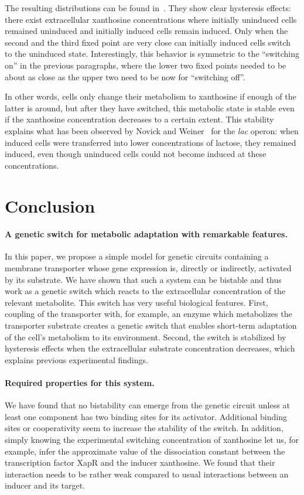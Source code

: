 \documentclass[10pt,letterpaper]{article}
\begin{document}
	The resulting distributions can be found in~. They show
	clear hysteresis effects: there exist extracellular xanthosine concentrations where
	initially uninduced cells remained uninduced and initially induced cells remain induced.
	Only when the second and the third fixed point are very close can initially
	induced cells switch to the uninduced state. Interestingly, this
	behavior is symmetric to the ``switching on'' in the previous paragraphs,
	where the lower two fixed points needed to be about as close as the upper
	two need to be now for ``switching off''.
	
	In other words, cells only change their metabolism to xanthosine if
	enough of the latter is around, but after they have switched, this metabolic
	state is stable even if the xanthosine concentration decreases to a certain
	extent. This stability explains what has been observed by Novick and
	Weiner~\cite{Novick1957} for the \emph{lac} operon: when induced cells were
	transferred into lower concentrations of lactose, they remained induced,
	even though uninduced cells could not become induced at these
	concentrations.
	
	
	\section*{Conclusion}
	\paragraph*{A genetic switch for metabolic adaptation with remarkable features.}
	In this paper, we propose a simple model for genetic circuits containing
	a membrane transporter whose gene expression is, directly or indirectly,
	activated by its substrate. We have shown that such a system can be bistable
	and thus work as a genetic switch which reacts to the extracellular
	concentration of the relevant metabolite. This switch has very useful
	biological features. First, coupling of the transporter with, for example, an
	enzyme which metabolizes the transporter substrate creates a genetic switch that enables short-term
	adaptation of the cell's metabolism to its environment. Second, the switch
	is stabilized by hysteresis effects when the extracellular substrate
	concentration decreases, which explains previous experimental findings.
	
	\paragraph*{Required properties for this system.}
	We have found that no bistability can emerge from the genetic circuit unless
	at least one component has two binding sites for its activator. Additional
	binding sites or cooperativity seem to increase the stability of the switch.
	In addition, simply knowing the experimental switching concentration of
	xanthosine let us, for example, infer the approximate value of the
	dissociation constant between the transcription factor XapR and the inducer
	xanthosine. We found that their interaction needs to be rather weak compared to usual interactions between an inducer and its target.
	
\end{document}
